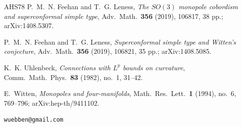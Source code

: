 \documentclass[11pt]{amsart}
\theoremstyle{definition}
\theoremstyle{remark}
\theoremstyle{plain}
\begin{document}
\begin{thebibliography}{AHS78}
 P.~M.~N. Feehan and T.~G. Leness,
\emph{The $SO(3)$ monopole cobordism and superconformal simple type},
Adv.\ Math.\ \textbf{356} (2019), 106817, 38 pp.; arXiv:1408.5307.

 P.~M.~N. Feehan and T.~G. Leness,
\emph{Superconformal simple type and Witten's conjecture},
Adv.\ Math.\ \textbf{356} (2019), 106821, 35 pp.; arXiv:1408.5085.

 K.~K. Uhlenbeck,
\emph{Connections with $L^p$ bounds on curvature}, Comm.\ Math.\ Phys.\
\textbf{83} (1982), no.~1, 31--42.

 E.~Witten,
\emph{Monopoles and four-manifolds}, Math.\ Res.\ Lett.\ \textbf{1}
(1994), no.~6, 769--796; arXiv:hep-th/9411102.

\end{thebibliography}

\bigskip
{}
\texttt{wuebben@gmail.com}
\end{document}
